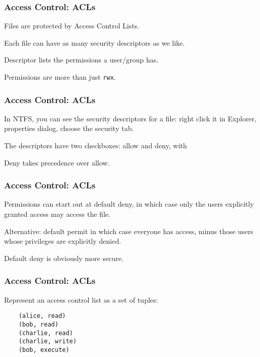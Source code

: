 \begin{frame}
\frametitle{Access Control: ACLs}
\begin{changemargin}{1cm}

Files are protected by Access Control Lists.

Each file can have as many security descriptors as we like.

Descriptor lists the permissions a user/group has.

Permissions are more than just \texttt{rwx}.

\end{changemargin}
\end{frame}

\begin{frame}
\frametitle{Access Control: ACLs}
\begin{changemargin}{1cm}

In NTFS, you can see the security descriptors for a file: right click it in Explorer, properties dialog, choose the security tab. 

The descriptors have two checkboxes: allow and deny, with 

Deny takes precedence over allow.

\end{changemargin}
\end{frame}

\begin{frame}
\frametitle{Access Control: ACLs}
\begin{changemargin}{1cm}

Permissions can start out at \alert{default deny}, in which case only the users explicitly granted access may access the file.

Alternative: \alert{default permit} in which case everyone has access, minus those users whose privileges are explicitly denied. 

Default deny is obviously more secure.

\end{changemargin}
\end{frame}

\begin{frame}[fragile]
\frametitle{Access Control: ACLs}
\begin{changemargin}{1cm}

Represent an access control list as a set of tuples:
\begin{verbatim}
	(alice, read)
	(bob, read)
	(charlie, read)
	(charlie, write)
	(bob, execute)
\end{verbatim}

\end{changemargin}
\end{frame}

